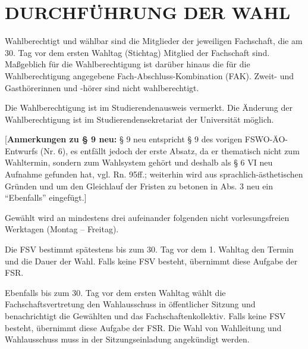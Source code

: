 \documentclass[%
draft,%
multilinesections%
]{fswo}
\newcommand\bemFr[1]{{\color{Red}[#1]}}
\newcommand\bemFr[1]{}%
\begin{document}
\section{DURCHFÜHRUNG DER WAHL}

\begin{contract}
Wahlberechtigt und wählbar sind die Mitglieder der jeweiligen Fachschaft, die am 30. Tag vor dem ersten Wahltag (Stichtag) Mitglied der Fachschaft sind.
Maßgeblich für die Wahlberechtigung ist darüber hinaus die für die Wahlberechtigung angegebene Fach-Abschluss-Kombination (FAK).
Zweit- und Gasthörerinnen und -hörer sind nicht wahlberechtigt.

Die Wahlberechtigung ist im Studierendenausweis vermerkt.
Die Änderung der Wahlberechtigung ist im Studierendensekretariat der Universität möglich.
\end{contract}

\bemFr{\textbf{Anmerkungen zu § 9 neu:}
§ 9 neu entspricht § 9 des vorigen FSWO-ÄO-Entwurfs (Nr. 6), es entfällt jedoch der erste Absatz, da er thematisch nicht zum Wahltermin, sondern zum Wahlsystem gehört
und deshalb als § 6 VI neu Aufnahme gefunden hat, vgl. Rn. 95ff.;
weiterhin wird aus sprachlich-ästhetischen Gründen und um den Gleichlauf der Fristen zu betonen in Abs. 3 neu ein \enquote{Ebenfalls} eingefügt.}

\begin{contract}
Gewählt wird an mindestens drei aufeinander folgenden nicht vorlesungsfreien Werktagen (Montag -- Freitag).

Die FSV bestimmt spätestens bis zum 30. Tag vor dem 1. Wahltag den Termin und die Dauer der Wahl.
Falls keine FSV besteht, übernimmt diese Aufgabe der FSR.

Ebenfalls bis zum 30. Tag vor dem ersten Wahltag wählt die Fachschaftsvertretung den Wahlausschuss in öffentlicher Sitzung und benachrichtigt die Gewählten und das Fachschaftenkollektiv.
Falls keine FSV besteht, übernimmt diese Aufgabe der FSR.
Die Wahl von Wahlleitung und Wahlausschuss muss in der Sitzungseinladung angekündigt werden.
\end{contract}
\end{document}
